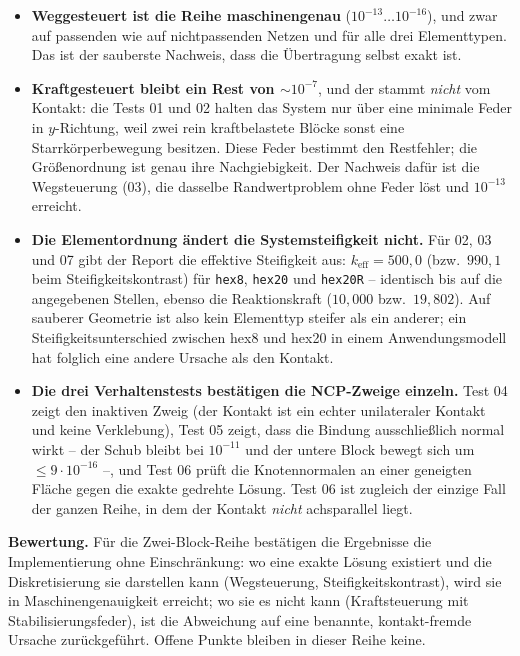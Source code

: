 \documentclass[a4paper,11pt]{article}
\newcommand{\code}[1]{\texttt{\small #1}}
\begin{document}
\begin{itemize}\itemsep2pt
  \item \textbf{Weggesteuert ist die Reihe maschinengenau} ($10^{-13}\ldots10^{-16}$), und zwar
        auf passenden wie auf nichtpassenden Netzen und für alle drei Elementtypen. Das ist der
        sauberste Nachweis, dass die Übertragung selbst exakt ist.
  \item \textbf{Kraftgesteuert bleibt ein Rest von $\sim\!10^{-7}$}, und der stammt \emph{nicht}
        vom Kontakt: die Tests 01 und 02 halten das System nur über eine minimale Feder in
        $y$-Richtung, weil zwei rein kraftbelastete Blöcke sonst eine Starrkörperbewegung
        besitzen. Diese Feder bestimmt den Restfehler; die Größenordnung ist genau ihre
        Nachgiebigkeit. Der Nachweis dafür ist die Wegsteuerung (03), die dasselbe
        Randwertproblem ohne Feder löst und $10^{-13}$ erreicht.
  \item \textbf{Die Elementordnung ändert die Systemsteifigkeit nicht.} Für 02, 03 und 07 gibt der
        Report die effektive Steifigkeit aus: $k_{\text{eff}}=500{,}0$ (bzw.\ $990{,}1$ beim
        Steifigkeitskontrast) für \code{hex8}, \code{hex20} und \code{hex20R} -- identisch bis auf
        die angegebenen Stellen, ebenso die Reaktionskraft ($10{,}000$ bzw.\ $19{,}802$). Auf
        sauberer Geometrie ist also kein Elementtyp steifer als ein anderer; ein
        Steifigkeitsunterschied zwischen hex8 und hex20 in einem Anwendungsmodell hat folglich
        eine andere Ursache als den Kontakt.
  \item \textbf{Die drei Verhaltenstests bestätigen die NCP-Zweige einzeln.} Test 04 zeigt den
        inaktiven Zweig (der Kontakt ist ein echter unilateraler Kontakt und keine Verklebung),
        Test 05 zeigt, dass die Bindung ausschließlich normal wirkt -- der Schub bleibt bei
        $10^{-11}$ und der untere Block bewegt sich um $\le9\cdot10^{-16}$ --, und Test 06 prüft
        die Knotennormalen an einer geneigten Fläche gegen die exakte gedrehte Lösung. Test 06
        ist zugleich der einzige Fall der ganzen Reihe, in dem der Kontakt \emph{nicht}
        achsparallel liegt.
\end{itemize}

\noindent \textbf{Bewertung.} Für die Zwei-Block-Reihe bestätigen die Ergebnisse die
Implementierung ohne Einschränkung: wo eine exakte Lösung existiert und die Diskretisierung sie
darstellen kann (Wegsteuerung, Steifigkeitskontrast), wird sie in Maschinengenauigkeit erreicht;
wo sie es nicht kann (Kraftsteuerung mit Stabilisierungsfeder), ist die Abweichung auf eine
benannte, kontakt-fremde Ursache zurückgeführt. Offene Punkte bleiben in dieser Reihe keine.
\end{document}
